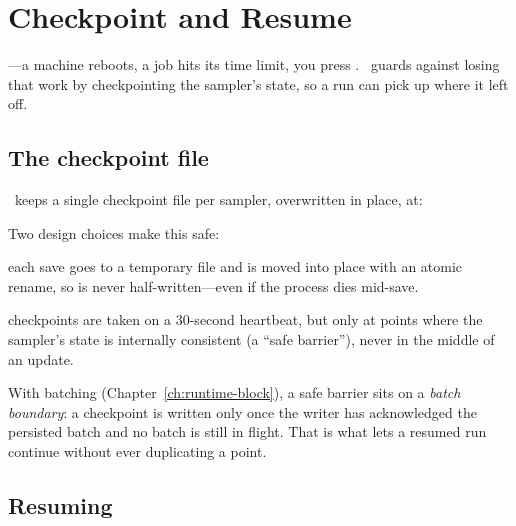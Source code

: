 \chapter{Checkpoint and Resume}
\label{ch:checkpoint}

---a machine reboots, a job hits its time limit, you press
. \Jarvis\ guards against losing that work by checkpointing the sampler's state, so a
run can pick up where it left off.

\section{The checkpoint file}
\label{sec:ckpt-file}

\Jarvis\ keeps a single checkpoint file per sampler, overwritten in place, at:

\begin{jfiletree}
\end{jfiletree}

\noindent Two design choices make this safe:

\begin{description}[style=nextline, leftmargin=1.2em]
  \item[Atomic writes] each save goes to a temporary file and is moved into place with an atomic
        rename, so  is never half-written---even if the process dies mid-save.
  \item[Safe barriers] checkpoints are taken on a 30-second heartbeat, but only at points where the
        sampler's state is internally consistent (a ``safe barrier''), never in the middle of an
        update.
\end{description}

\begin{jnote}
With batching (Chapter~\ref{ch:runtime-block}), a safe barrier sits on a \emph{batch boundary}: a
checkpoint is written only once the writer has acknowledged the persisted batch and no batch is still
in flight. That is what lets a resumed run continue without ever duplicating a point.
\end{jnote}

\section{Resuming}
\label{sec:ckpt-resume}

